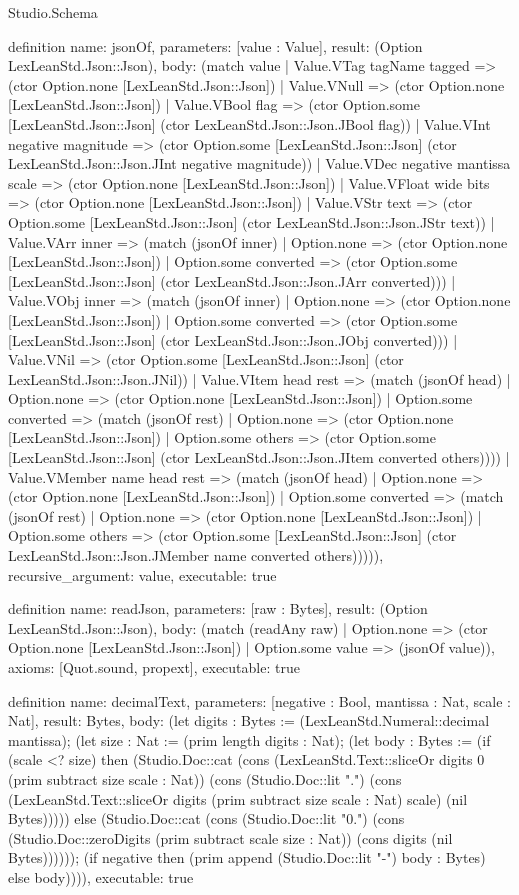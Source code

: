 \begin{lexlean}{Studio.Schema}
\begin{semanticmodule}
definition{
  name: jsonOf,
  parameters: [value : Value],
  result: (Option LexLeanStd.Json::Json),
  body: (match value
    | Value.VTag tagName tagged => (ctor Option.none [LexLeanStd.Json::Json])
    | Value.VNull => (ctor Option.none [LexLeanStd.Json::Json])
    | Value.VBool flag => (ctor Option.some [LexLeanStd.Json::Json] (ctor LexLeanStd.Json::Json.JBool flag))
    | Value.VInt negative magnitude => (ctor Option.some [LexLeanStd.Json::Json] (ctor LexLeanStd.Json::Json.JInt negative magnitude))
    | Value.VDec negative mantissa scale => (ctor Option.none [LexLeanStd.Json::Json])
    | Value.VFloat wide bits => (ctor Option.none [LexLeanStd.Json::Json])
    | Value.VStr text => (ctor Option.some [LexLeanStd.Json::Json] (ctor LexLeanStd.Json::Json.JStr text))
    | Value.VArr inner => (match (jsonOf inner)
      | Option.none => (ctor Option.none [LexLeanStd.Json::Json])
      | Option.some converted => (ctor Option.some [LexLeanStd.Json::Json] (ctor LexLeanStd.Json::Json.JArr converted)))
    | Value.VObj inner => (match (jsonOf inner)
      | Option.none => (ctor Option.none [LexLeanStd.Json::Json])
      | Option.some converted => (ctor Option.some [LexLeanStd.Json::Json] (ctor LexLeanStd.Json::Json.JObj converted)))
    | Value.VNil => (ctor Option.some [LexLeanStd.Json::Json] (ctor LexLeanStd.Json::Json.JNil))
    | Value.VItem head rest => (match (jsonOf head)
      | Option.none => (ctor Option.none [LexLeanStd.Json::Json])
      | Option.some converted => (match (jsonOf rest)
        | Option.none => (ctor Option.none [LexLeanStd.Json::Json])
        | Option.some others => (ctor Option.some [LexLeanStd.Json::Json] (ctor LexLeanStd.Json::Json.JItem converted others))))
    | Value.VMember name head rest => (match (jsonOf head)
      | Option.none => (ctor Option.none [LexLeanStd.Json::Json])
      | Option.some converted => (match (jsonOf rest)
        | Option.none => (ctor Option.none [LexLeanStd.Json::Json])
        | Option.some others => (ctor Option.some [LexLeanStd.Json::Json] (ctor LexLeanStd.Json::Json.JMember name converted others))))),
  recursive_argument: value,
  executable: true
}

definition{
  name: readJson,
  parameters: [raw : Bytes],
  result: (Option LexLeanStd.Json::Json),
  body: (match (readAny raw)
    | Option.none => (ctor Option.none [LexLeanStd.Json::Json])
    | Option.some value => (jsonOf value)),
  axioms: [Quot.sound, propext],
  executable: true
}

definition{
  name: decimalText,
  parameters: [negative : Bool, mantissa : Nat, scale : Nat],
  result: Bytes,
  body: (let digits : Bytes := (LexLeanStd.Numeral::decimal mantissa); (let size : Nat := (prim length digits : Nat); (let body : Bytes := (if (scale <? size) then (Studio.Doc::cat (cons (LexLeanStd.Text::sliceOr digits 0 (prim subtract size scale : Nat)) (cons (Studio.Doc::lit ".") (cons (LexLeanStd.Text::sliceOr digits (prim subtract size scale : Nat) scale) (nil Bytes))))) else (Studio.Doc::cat (cons (Studio.Doc::lit "0.") (cons (Studio.Doc::zeroDigits (prim subtract scale size : Nat)) (cons digits (nil Bytes)))))); (if negative then (prim append (Studio.Doc::lit "-") body : Bytes) else body)))),
  executable: true
}


\end{semanticmodule}
\end{lexlean}
